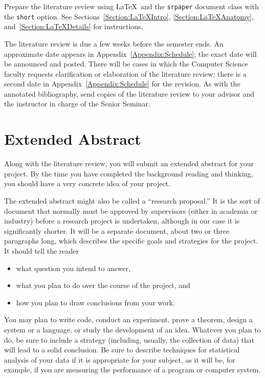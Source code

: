 \documentclass[finalcopy]{srpaper}
\def\hyperref[#1]{}
\let\plainref\ref
\newcommand{\plainref}{\ref*}
\newcommand{\namedref}[2]{\hyperref[#2]{#1~\plainref{#2}}}
\begin{document}
Prepare the literature review using \LaTeX\ and the
\texttt{srpaper} document class with the \texttt{short}
option.
See \namedref{Sections}{Section:LaTeXIntro},
\ref{Section:LaTeXAnatomy}, and~\ref{Section:LaTeXDetails}
for instructions.

The literature review is due a few weeks before the semester
ends. An approximate date appears in
\namedref{Appendix}{Appendix:Schedule}; the exact date will
be announced and posted. There will be cases 
in which the Computer Science faculty requests clarification
or elaboration of the literature review; there is a second
date in \namedref{Appendix}{Appendix:Schedule} for the
revision. As with the annotated bibliography, send copies
of the literature review to
your advisor and the instructor in charge of the Senior
Seminar.


\section{Extended Abstract}
\label{Section:ExtendedAbstract}
Along with the literature review, you will submit an extended
abstract for your project. By the time 
you have completed the background reading and thinking, 
you should have a very concrete idea of your project.

The extended abstract might also be called a ``research
proposal.'' It is the sort of document that normally must be
approved by supervisors (either in academia or industry) before
a research project is undertaken, although in our case it is
significantly shorter.  It will be a separate document,
about two or three paragraphs long, which describes the
specific goals and strategies for the project. It should
tell the reader
\begin{itemize}
\item what question you intend to answer,
\item what you plan to do over the course of the project, and
\item how you plan to draw conclusions from your work.
\end{itemize}
You may plan to write code, conduct
an experiment, prove a theorem, design a system or a
language, or study the development of an idea. Whatever you
plan to do, be sure to include a strategy (including,
usually, the collection of data) that will lead to a 
solid conclusion.
Be sure to describe techniques for statistical analysis of
your data if it is appropriate for your subject, as it will
be, for example, if you are measuring the performance of a
program or computer system.
\end{document}
